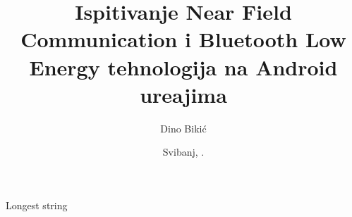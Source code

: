 



\frontmatter   %



\title{Ispitivanje Near Field Communication i Bluetooth Low Energy tehnologija na Android ure\dj ajima}   %

\date{Svibanj, \thisyear.}   %

\author{Dino Biki\'{c}}  %
\maketitle		%




\maketitleabstract

\begin{assignmentpage}
\end{assignmentpage}

\begin{honestystatementpage}
\end{honestystatementpage}

\tableofcontents
\listoffigures


\begin{glossary}{Longest string}
	
\end{glossary}

